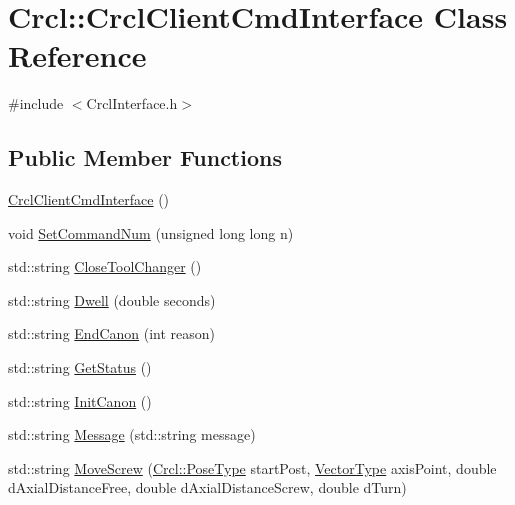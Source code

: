 \hypertarget{classCrcl_1_1CrclClientCmdInterface}{\section{Crcl\-:\-:Crcl\-Client\-Cmd\-Interface Class Reference}
\label{classCrcl_1_1CrclClientCmdInterface}
}


{\ttfamily \#include $<$Crcl\-Interface.\-h$>$}

\subsection*{Public Member Functions}
\begin{DoxyCompactItemize}
\item 
\hyperlink{classCrcl_1_1CrclClientCmdInterface_a7c2ea74f24d04a0048b285ba98611749}{Crcl\-Client\-Cmd\-Interface} ()
\item 
void \hyperlink{classCrcl_1_1CrclClientCmdInterface_a089de9ab1afb6f23dbebcf844abd30e2}{Set\-Command\-Num} (unsigned long long n)
\item 
std\-::string \hyperlink{classCrcl_1_1CrclClientCmdInterface_a7373f6122f7c8386752a2cfde7f750e5}{Close\-Tool\-Changer} ()
\item 
std\-::string \hyperlink{classCrcl_1_1CrclClientCmdInterface_a1d58b154f382c7346d6dabba9c77a08e}{Dwell} (double seconds)
\item 
std\-::string \hyperlink{classCrcl_1_1CrclClientCmdInterface_a6222121cebc0938bd19863230ec7e3db}{End\-Canon} (int reason)
\item 
std\-::string \hyperlink{classCrcl_1_1CrclClientCmdInterface_a78a380822383ba3e848aa817d2e683ad}{Get\-Status} ()
\item 
std\-::string \hyperlink{classCrcl_1_1CrclClientCmdInterface_a52f5e4dbb9e788cf440913f59ceb39a1}{Init\-Canon} ()
\item 
std\-::string \hyperlink{classCrcl_1_1CrclClientCmdInterface_a3779c2ae65b84008cf18d7295bddd6bc}{Message} (std\-::string message)
\item 
std\-::string \hyperlink{classCrcl_1_1CrclClientCmdInterface_abf53a322d43d941e678886d38866d351}{Move\-Screw} (\hyperlink{namespaceCrcl_acc6c82b52280f4d0e74b82a92400956e}{Crcl\-::\-Pose\-Type} start\-Post, \hyperlink{namespaceCrcl_ae868d4ece511d1485ed5d9118395aef8}{Vector\-Type} axis\-Point, double d\-Axial\-Distance\-Free, double d\-Axial\-Distance\-Screw, double d\-Turn)
\item 

\end{DoxyCompactItemize}
